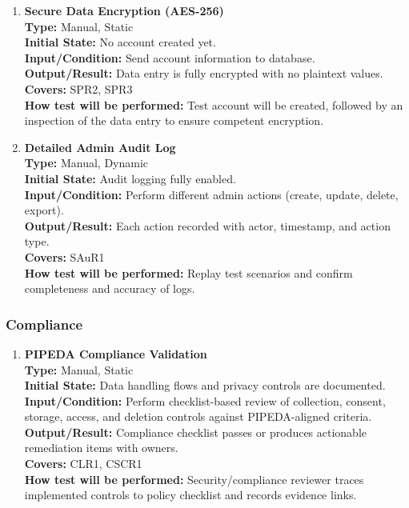 \documentclass[12pt, titlepage]{article}
\begin{document}
\begin{enumerate}[label=\bfseries ST-\arabic*:, wide=0pt]
  \item \label{test-ST4} \textbf{Secure Data Encryption (AES-256)}\\[2mm]
    {\bf Type:} Manual, Static\\
    {\bf Initial State:} No account created yet.\\
    {\bf Input/Condition:} Send account information to database.\\
    {\bf Output/Result:} Data entry is fully encrypted with no plaintext values.\\
    {\bf Covers:} SPR2, SPR3\\
    {\bf How test will be performed:} Test account will be created, followed by an inspection of the data entry to ensure competent encryption.\\

  \item \label{test-ST5} \textbf{Detailed Admin Audit Log}\\[2mm]
    {\bf Type:} Manual, Dynamic\\
    {\bf Initial State:} Audit logging fully enabled.\\
    {\bf Input/Condition:} Perform different admin actions (create, update, delete, export).\\
    {\bf Output/Result:} Each action recorded with actor, timestamp, and action type.\\
    {\bf Covers:} SAuR1\\
    {\bf How test will be performed:} Replay test scenarios and confirm completeness and accuracy of logs.\\

\end{enumerate}

\subsubsection{Compliance}
\begin{enumerate}[label=\bfseries CM-\arabic*:, wide=0pt]
  \item \label{test-CM1} \textbf{PIPEDA Compliance Validation}\\[2mm]
    {\bf Type:} Manual, Static\\
    {\bf Initial State:} Data handling flows and privacy controls are documented.\\
    {\bf Input/Condition:} Perform checklist-based review of collection, consent, storage, access, and deletion controls against PIPEDA-aligned criteria.\\
    {\bf Output/Result:} Compliance checklist passes or produces actionable remediation items with owners.\\
    {\bf Covers:} CLR1, CSCR1\\
    {\bf How test will be performed:} Security/compliance reviewer traces implemented controls to policy checklist and records evidence links.
\end{enumerate}
\end{document}
